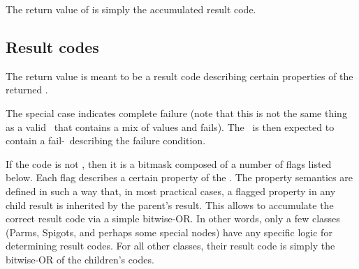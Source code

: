 \documentclass[10pt]{article}
\begin{document}
  The return value of  is simply the accumulated result code.
  
\subsection{Result codes}

  The return value is meant to be a result code describing certain properties 
  of the returned \Result. 
  
  The special case  indicates complete failure (note that this is not
  the same thing as a valid \Result\ that contains a mix of values and fails).
  The \Result\ is then expected to contain a fail-\VellSet\ describing the
  failure condition. 

  If the code is not , then it is a bitmask composed of a number of
  flags listed below. Each flag describes a certain property of the \Result.
  The property semantics are defined in such a way that, in most practical
  cases, a flagged property in any child result is inherited by the parent's
  result. This allows  to accumulate the correct result code via
  a simple bitwise-OR. In other words, only a few classes (Parms, Spigots, and
  perhaps some special nodes) have any specific logic for determining result
  codes. For all other  classes, their result code is simply the bitwise-OR of
  the children's codes.
\end{document}
